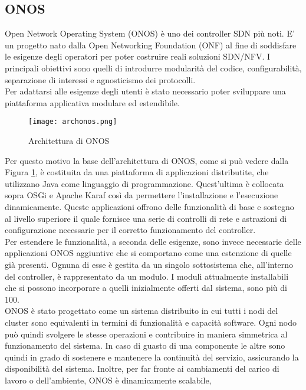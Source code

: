 \subsection{ONOS}
Open Network Operating System (ONOS) \cite{ONOS} è uno dei controller SDN più noti. 
E' un progetto nato dalla Open Networking Foundation (ONF) \cite{ONF} al fine di soddisfare le esigenze degli operatori per poter costruire reali soluzioni SDN/NFV.
I principali obiettivi sono quelli di introdurre modularità del codice, configurabilità, separazione di interessi e agnosticismo dei protocolli.
\\Per adattarsi alle esigenze degli utenti è stato necessario poter sviluppare una piattaforma applicativa modulare ed estendibile.
\begin{figure}[h]
    \centering
   \texttt{[image: archonos.png]}
    \caption{Architettura di ONOS \cite{archonos}}
    \label{fig:img3}
\end{figure}
Per questo motivo la base dell'architettura di ONOS, come si può vedere dalla Figura \ref{fig:img3}, è costituita da una piattaforma di applicazioni distributite, che utilizzano Java come linguaggio di programmazione.
Quest'ultima è collocata sopra OSGi \cite{osgi} e Apache Karaf \cite{Apache} così da permettere l'installazione e l'esecuzione dinamicamente. 
Queste applicazioni offrono delle funzionalità di base e sostegno al livello superiore il quale fornisce una serie di controlli di rete e astrazioni di configurazione necessarie per il corretto funzionamento del controller.
\\Per estendere le funzionalità, a seconda delle esigenze, sono invece necessarie delle applicazioni ONOS aggiuntive che si comportano come una estenzione di quelle già presenti. 
Ognuna di esse è gestita da un singolo sottosistema che, all'interno del controller, è rappresentato da un modulo.
I moduli attualmente installabili che si possono incorporare a quelli inizialmente offerti dal sistema, sono più di 100.
\\ONOS è stato progettato come un sistema distribuito in cui tutti i nodi del cluster sono equivalenti in termini di funzionalità e capacità software.
Ogni nodo può quindi svolgere le stesse operazioni e contribuire in maniera simmetrica al funzionamento del sistema.
In caso di guasto di una componente le altre sono quindi in grado di sostenere e mantenere la continuità del servizio, assicurando la disponibilità del sistema. Inoltre, per far fronte ai cambiamenti del carico di lavoro o dell'ambiente, ONOS è dinamicamente scalabile, 
